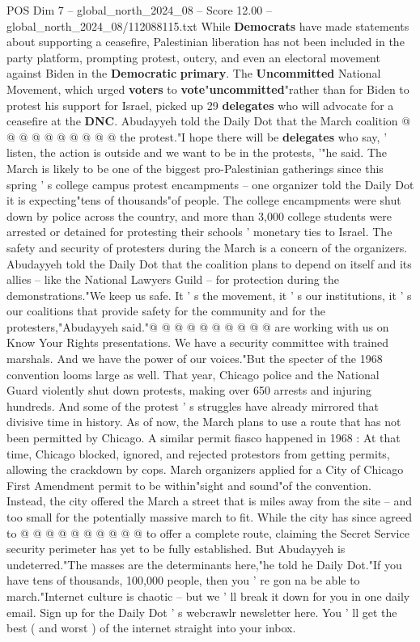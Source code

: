 \begin{textsample}{POS Dim 7 – global\_north\_2024\_08 – Score 12.00 – global\_north\_2024\_08/112088115.txt}
While \textbf{Democrats} have made statements about supporting a ceasefire, Palestinian liberation has not been included in the party platform, prompting protest, outcry, and even an electoral movement against Biden in the \textbf{Democratic} \textbf{primary}.
The \textbf{Uncommitted} National Movement, which urged \textbf{voters} to \textbf{vote}"\textbf{uncommitted}"rather than for Biden to protest his support for Israel, picked up 29 \textbf{delegates} who will advocate for a ceasefire at the \textbf{DNC}.
Abudayyeh told the Daily Dot that the March coalition @ @ @ @ @ @ @ @ @ @ the protest."I hope there will be \textbf{delegates} who say, ' listen, the action is outside and we want to be in the protests, '"he said.
The March is likely to be one of the biggest pro-Palestinian gatherings since this spring ' s college campus protest encampments -- one organizer told the Daily Dot it is expecting"tens of thousands"of people.
The college encampments were shut down by police across the country, and more than 3,000 college students were arrested or detained for protesting their schools ' monetary ties to Israel.
The safety and security of protesters during the March is a concern of the organizers.
Abudayyeh told the Daily Dot that the coalition plans to depend on itself and its allies -- like the National Lawyers Guild -- for protection during the demonstrations."We keep us safe.
It ' s the movement, it ' s our institutions, it ' s our coalitions that provide safety for the community and for the protesters,"Abudayyeh said."@ @ @ @ @ @ @ @ @ @ are working with us on Know Your Rights presentations.
We have a security committee with trained marshals.
And we have the power of our voices."But the specter of the 1968 convention looms large as well.
That year, Chicago police and the National Guard violently shut down protests, making over 650 arrests and injuring hundreds.
And some of the protest ' s struggles have already mirrored that divisive time in history.
As of now, the March plans to use a route that has not been permitted by Chicago.
A similar permit fiasco happened in 1968 : At that time, Chicago blocked, ignored, and rejected protestors from getting permits, allowing the crackdown by cops.
March organizers applied for a City of Chicago First Amendment permit to be within"sight and sound"of the convention.
Instead, the city offered the March a street that is miles away from the site -- and too small for the potentially massive march to fit.
While the city has since agreed to @ @ @ @ @ @ @ @ @ @ to offer a complete route, claiming the Secret Service security perimeter has yet to be fully established.
But Abudayyeh is undeterred."The masses are the determinants here,"he told he Daily Dot."If you have tens of thousands, 100,000 people, then you ' re gon na be able to march."Internet culture is chaotic -- but we ' ll break it down for you in one daily email.
Sign up for the Daily Dot ' s webcrawlr newsletter here.
You ' ll get the best ( and worst ) of the internet straight into your inbox.

\end{textsample}
